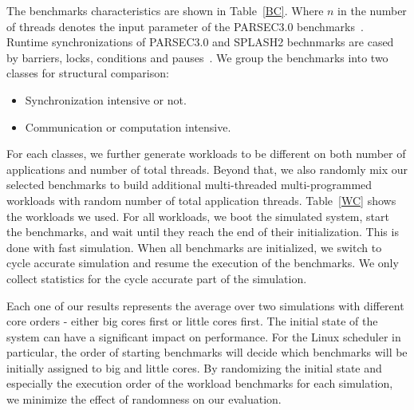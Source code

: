 The benchmarks characteristics are shown in Table~\ref{BC}. Where $n$ in the number of threads denotes the input parameter of the PARSEC3.0 benchmarks~\cite{southern2016analysis}. Runtime synchronizations of PARSEC3.0 and SPLASH2 bechnmarks are cased by barriers, locks, conditions and pauses~\cite{bienia2008parsec,woo1995splash}. We group the benchmarks into two classes for structural comparison:
\begin{itemize}
    \item Synchronization intensive or not.
    \item Communication or computation intensive.
\end{itemize}

For each classes, we further generate workloads to be different on both number of applications and number of total threads. Beyond that, we also randomly mix our selected benchmarks to build additional multi-threaded multi-programmed workloads with random number of total application threads.
Table~\ref{WC} shows the workloads we used. For all workloads, we boot the simulated system, start the benchmarks, and wait until they reach the end of their initialization. This is done with fast simulation. When all benchmarks are initialized, we switch to cycle accurate simulation and resume the execution of the benchmarks. We only collect statistics for the cycle accurate part of the simulation.

Each one of our results represents the average over two simulations with different core orders - either big cores first or little cores first. The initial state of the system can have a significant impact on performance. For the Linux scheduler in particular, the order of starting benchmarks will decide which benchmarks will be initially assigned to big and little cores. By randomizing the initial state and especially the execution order of the workload benchmarks for each simulation, we minimize the effect of randomness on our evaluation.


